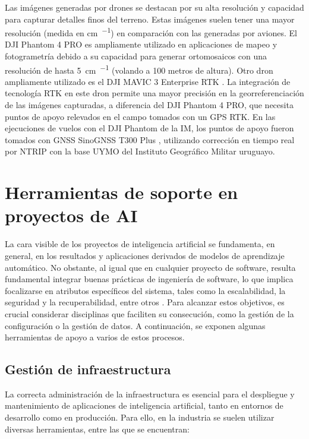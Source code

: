 Las imágenes generadas por drones se destacan por su alta resolución y capacidad para capturar detalles finos del terreno. Estas imágenes suelen tener una mayor resolución (medida en \si{\centi\meter\per\pixel}) en comparación con las generadas por aviones. El DJI Phantom 4 PRO \citep{dji_support_nodate} es ampliamente utilizado en aplicaciones de mapeo y fotogrametría debido a su capacidad para generar ortomosaicos con una resolución de hasta \SI{5}{\centi\meter\per\pixel} (volando a 100 metros de altura). Otro dron ampliamente utilizado es el DJI MAVIC 3 Enterprise RTK \citep{dji_specs_nodate}. La integración de tecnología RTK \citep{wikipedia_rtk_2024} en este dron permite una mayor precisión en la georreferenciación de las imágenes capturadas, a diferencia del DJI Phantom 4 PRO, que necesita puntos de apoyo relevados en el campo tomados con un GPS RTK. En las ejecuciones de vuelos con el DJI Phantom de la IM, los puntos de apoyo fueron tomados con GNSS SinoGNSS T300 Plus \citep{comnav_technology_ltd_receptor_nodate}, utilizando corrección en tiempo real por NTRIP \citep{wikipedia_networked_2025} con la base UYMO del Instituto Geográfico Militar uruguayo.

\section{Herramientas de soporte en proyectos de AI}
\label{sec:herramSopIA}

La cara visible de los proyectos de inteligencia artificial se fundamenta, en general, en los resultados y aplicaciones derivados de modelos de aprendizaje automático. No obstante, al igual que en cualquier proyecto de software, resulta fundamental integrar buenas prácticas de ingeniería de software, lo que implica focalizarse en atributos específicos del sistema, tales como la escalabilidad, la seguridad y la recuperabilidad, entre otros \citep{sommerville_software_2015}. Para alcanzar estos objetivos, es crucial considerar disciplinas que faciliten su consecución, como la gestión de la configuración o la gestión de datos. A continuación, se exponen algunas herramientas de apoyo a varios de estos procesos.

\subsection{Gestión de infraestructura}
\label{sec:gestionDeinfraestructura}

La correcta administración de la infraestructura es esencial para el despliegue y mantenimiento de aplicaciones de inteligencia artificial, tanto en entornos de desarrollo como en producción. Para ello, en la industria se suelen utilizar diversas herramientas, entre las que se encuentran:

